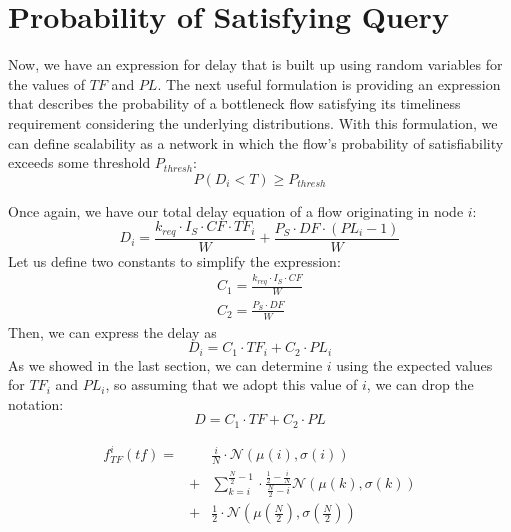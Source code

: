\section{Probability of Satisfying Query}
\label{sec:prob_sat}

Now, we have an expression for delay that is built up using random variables for the values of $TF$ and $PL$.  The next useful formulation is providing an expression that describes the probability of a bottleneck flow satisfying its timeliness requirement considering the underlying distributions.  With this formulation, we can define scalability as a network in which the flow's probability of satisfiability exceeds some threshold $P_{thresh}$:
\begin{equation}
	P(D_i < T) \geq P_{thresh}
\end{equation}

Once again, we have our total delay equation of a flow originating in node $i$:
\begin{equation}
	D_i = \frac{ k_{req} \cdot I_S \cdot CF \cdot TF_i}{W} + \frac{P_S \cdot DF \cdot (PL_i-1)}{W}
\end{equation}
Let us define two constants to simplify the expression:
\begin{eqnarray*}
	C_1 = \frac{k_{req} \cdot I_S \cdot CF}{W} \\
	C_2 = \frac{P_S \cdot DF}{W}
\end{eqnarray*}
Then, we can express the delay as
\begin{equation}
	D_i = C_1 \cdot TF_i + C_2 \cdot PL_i
\end{equation}
As we showed in the last section, we can determine $i$ using the expected values for $TF_i$ and $PL_i$, so assuming that we adopt this value of $i$, we can drop the notation:
\begin{equation}
	D = C_1 \cdot TF + C_2 \cdot PL
\end{equation}

\begin{eqnarray}
\nonumber
	f_{TF}^i (tf) = &&\frac{i}{N} \cdot \mathcal{N}(\mu(i),\sigma(i))  \\ \nonumber
			   &+& \sum\limits_{k=i}^{\frac{N}{2}-1} \cdot \frac{\frac{1}{2}-\frac{i}{N}}{\frac{N}{2} - i}\mathcal{N}(\mu(k),\sigma(k))  \\
			   &+& \frac{1}{2} \cdot \mathcal{N} (\mu(\frac{N}{2}),\sigma(\frac{N}{2}))
\label{eq:full_PDF_TF}
\end{eqnarray}













